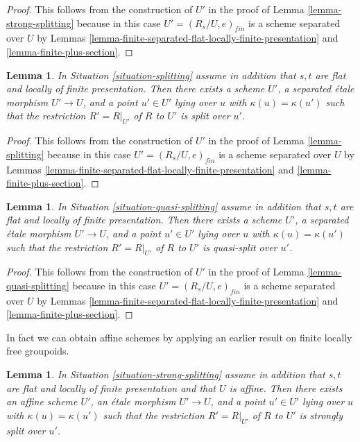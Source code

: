 \documentclass{stacks-project}
\theoremstyle{plain}
\newtheorem{lemma}[subsection]{Lemma}
\theoremstyle{definition}
\theoremstyle{remark}
\numberwithin{equation}{subsection}
\begin{document}
\begin{proof}
This follows from the construction of $U'$ in the proof of
Lemma \ref{lemma-strong-splitting}
because in this case $U' = (R_s/U, e)_{fin}$ is a scheme separated over
$U$ by
Lemmas \ref{lemma-finite-separated-flat-locally-finite-presentation} and
\ref{lemma-finite-plus-section}.
\end{proof}

\begin{lemma}
\label{lemma-splitting-scheme}
In Situation \ref{situation-splitting} assume in addition that
$s, t$ are flat and locally of finite presentation.
Then there exists a scheme $U'$, a separated \'etale morphism
$U' \to U$, and a point $u' \in U'$
lying over $u$ with $\kappa(u) = \kappa(u')$
such that the restriction $R' = R|_{U'}$ of $R$ to $U'$
is split over $u'$.
\end{lemma}

\begin{proof}
This follows from the construction of $U'$ in the proof of
Lemma \ref{lemma-splitting}
because in this case $U' = (R_s/U, e)_{fin}$ is a scheme separated over
$U$ by
Lemmas \ref{lemma-finite-separated-flat-locally-finite-presentation} and
\ref{lemma-finite-plus-section}.
\end{proof}

\begin{lemma}
\label{lemma-quasi-splitting-scheme}
In Situation \ref{situation-quasi-splitting} assume in addition that
$s, t$ are flat and locally of finite presentation.
Then there exists a scheme $U'$, a separated \'etale morphism
$U' \to U$, and a point $u' \in U'$ lying over $u$ with
$\kappa(u) = \kappa(u')$ such that the restriction $R' = R|_{U'}$ of
$R$ to $U'$ is quasi-split over $u'$.
\end{lemma}

\begin{proof}
This follows from the construction of $U'$ in the proof of
Lemma \ref{lemma-quasi-splitting}
because in this case $U' = (R_s/U, e)_{fin}$ is a scheme separated
over $U$ by
Lemmas \ref{lemma-finite-separated-flat-locally-finite-presentation} and
\ref{lemma-finite-plus-section}.
\end{proof}

\noindent
In fact we can obtain affine schemes by applying an earlier result
on finite locally free groupoids.

\begin{lemma}
\label{lemma-strong-splitting-affine-scheme}
In Situation \ref{situation-strong-splitting} assume in addition that
$s, t$ are flat and locally of finite presentation and that $U$ is affine.
Then there exists an affine scheme $U'$, an \'etale morphism
$U' \to U$, and a point $u' \in U'$ lying over $u$ with
$\kappa(u) = \kappa(u')$ such that the restriction $R' = R|_{U'}$ of
$R$ to $U'$ is strongly split over $u'$.
\end{lemma}
\end{document}
